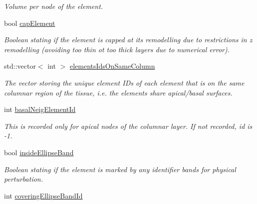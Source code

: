 \begin{DoxyCompactItemize}
\begin{DoxyCompactList}\small\item\em Volume per node of the element. \end{DoxyCompactList}\item 
\hypertarget{classShapeBase_a21420915ac7c8444e0e5b5f4e98d7322}{}bool \hyperlink{classShapeBase_a21420915ac7c8444e0e5b5f4e98d7322}{cap\+Element}\label{classShapeBase_a21420915ac7c8444e0e5b5f4e98d7322}

\begin{DoxyCompactList}\small\item\em Boolean stating if the element is capped at its remodelling due to restrictions in z remodelling (avoiding too thin ot too thick layers due to numerical error). \end{DoxyCompactList}\item 
\hypertarget{classShapeBase_a5ef483e9f69872329b0a6365803dc8ff}{}std\+::vector$<$ int $>$ \hyperlink{classShapeBase_a5ef483e9f69872329b0a6365803dc8ff}{elements\+Ids\+On\+Same\+Column}\label{classShapeBase_a5ef483e9f69872329b0a6365803dc8ff}

\begin{DoxyCompactList}\small\item\em The vector storing the unique element I\+Ds of each element that is on the same columnar region of the tissue, i.\+e. the elements share apical/basal surfaces. \end{DoxyCompactList}\item 
\hypertarget{classShapeBase_a7515f99cadce806894a7c254186a85f7}{}int \hyperlink{classShapeBase_a7515f99cadce806894a7c254186a85f7}{basal\+Neig\+Element\+Id}\label{classShapeBase_a7515f99cadce806894a7c254186a85f7}

\begin{DoxyCompactList}\small\item\em This is recorded only for apical nodes of the columnar layer. If not recorded, id is -\/1. \end{DoxyCompactList}\item 
\hypertarget{classShapeBase_a1571eea2fb8259868afa5814540fe61d}{}bool \hyperlink{classShapeBase_a1571eea2fb8259868afa5814540fe61d}{inside\+Ellipse\+Band}\label{classShapeBase_a1571eea2fb8259868afa5814540fe61d}

\begin{DoxyCompactList}\small\item\em Boolean stating if the element is marked by any identifier bands for physical perturbation. \end{DoxyCompactList}\item 
\hypertarget{classShapeBase_a8d2b9ded0e51df7c23499ccc3f4da9fc}{}int \hyperlink{classShapeBase_a8d2b9ded0e51df7c23499ccc3f4da9fc}{covering\+Ellipse\+Band\+Id}\label{classShapeBase_a8d2b9ded0e51df7c23499ccc3f4da9fc}


\end{DoxyCompactItemize}
